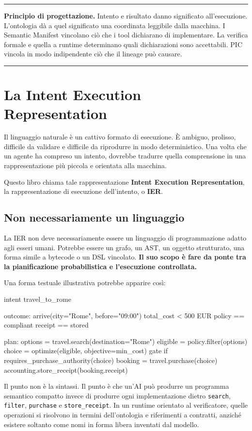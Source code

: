 \documentclass[10pt,oneside,openany]{book}
\newcommand{\term}[1]{\textbf{#1}}
\newcommand{\principle}[1]{%
  \vspace{4pt}
  \noindent\begin{minipage}{\linewidth}
  \hrule\vspace{5pt}
  \small\sffamily\raggedright\textbf{Principio di progettazione.} #1
  \vspace{5pt}\hrule
  \end{minipage}\vspace{4pt}
}
\newcommand{\mono}[1]{\texttt{#1}}
\begin{document}
\principle{Intento e risultato danno significato all'esecuzione. L'ontologia dà a quel significato una coordinata leggibile dalla macchina. I Semantic Manifest vincolano ciò che i tool dichiarano di implementare. La verifica formale e quella a runtime determinano quali dichiarazioni sono accettabili. PIC vincola in modo indipendente ciò che il lineage può causare.}

\chapter{La Intent Execution Representation}\label{ch:ier}

Il linguaggio naturale è un cattivo formato di esecuzione. È ambiguo, prolisso, difficile da validare e difficile da riprodurre in modo deterministico. Una volta che un agente ha compreso un intento, dovrebbe tradurre quella comprensione in una rappresentazione più piccola e orientata alla macchina.

Questo libro chiama tale rappresentazione \term{Intent Execution Representation}, la rappresentazione di esecuzione dell'intento, o \term{IER}.

\section{Non necessariamente un linguaggio}
La IER non deve necessariamente essere un linguaggio di programmazione adatto agli esseri umani. Potrebbe essere un grafo, un AST, un oggetto strutturato, una forma simile a bytecode o un DSL vincolato. \textbf{Il suo scopo è fare da ponte tra la pianificazione probabilistica e l'esecuzione controllata.}

Una forma testuale illustrativa potrebbe apparire così:

\begin{codeblock}
intent travel_to_rome {
  outcome:
    arrive(city="Rome", before="09:00")
    total_cost < 500 EUR
    policy == compliant
    receipt == stored

  plan:
    options = travel.search(destination="Rome")
    eligible = policy.filter(options)
    choice = optimize(eligible, objective=min_cost)
    gate if requires_purchase_authority(choice)
    booking = travel.purchase(choice)
    accounting.store_receipt(booking.receipt)
}
\end{codeblock}

Il punto non è la sintassi. Il punto è che un'AI può produrre un programma semantico compatto invece di produrre ogni implementazione dietro \mono{search}, \mono{filter}, \mono{purchase} e \mono{store\_receipt}. In un runtime orientato al verificatore, quelle operazioni si risolvono in termini dell'ontologia e riferimenti a contratti, anziché esistere soltanto come nomi in forma libera inventati dal modello.
\end{document}
